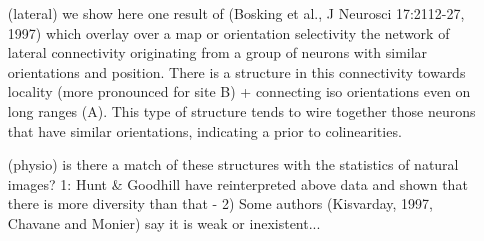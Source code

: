 \documentclass[10pt,ignorenonframetext]{beamer}%
\begin{document}
{{\begin{itemize}
		 \item[(lateral)] we show here one result of (Bosking et al., J Neurosci 17:2112-27, 1997) which overlay over a map or orientation selectivity the network of lateral connectivity originating from  a  group of neurons with similar orientations and position. There is a structure in this connectivity towards locality (more pronounced for site B) + connecting iso orientations even on long ranges (A). This type of structure tends to wire together those neurons that have similar orientations, indicating a prior to colinearities. %
		 \item[(physio)] is there a match of these structures with the statistics of natural images? 1:  Hunt \& Goodhill have reinterpreted above data and shown that there is more diversity than that - 2) Some authors (Kisvarday, 1997, Chavane and Monier) say it is weak or inexistent...
	\end{itemize}
	}%
}%

\frame[label=intro2b]{%
\begin{center}
	\includegraphics<1|handout:1>[width=\linewidth]{Miikkulainen05.pdf}%
\end{center}
\vfill%
\only<1|handout:1>{[Choe et~al. 2004; Miikkulainen et al., 2005]}%
\note{%
	This prior can be introduced in models:
	 \begin{itemize}
		 \item[(colin)] . This is a typical assumption that the role of lateral interactions is to enhance the activity of neurons which are collinear : it is the so-called \emph{association field} formalized in Field 93, %
		 \item[(model)]	knowing the structure of this connectivity is important for our understanding of the neural computations operating in the primary visual cortex as is captured by models such as the topographically-based LISSOM from Miikulainen and Bednar (topographica) (Choe and Miikkulainen, 2004) %
	\end{itemize}
	}%
}%
\end{document}
